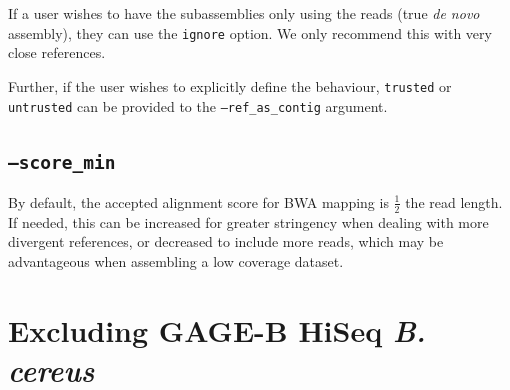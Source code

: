 \documentclass[10pt]{article}
\begin{document}
If a user wishes to have the subassemblies only using the reads (true \textit{de novo} assembly), they can use the \texttt{ignore} option.  We only recommend this with very close references.

Further, if the user wishes to explicitly define the behaviour, \texttt{trusted} or \texttt{untrusted} can be provided to the \texttt{--ref\_as\_contig} argument.

\subsection*{\texttt{--score\_min}}
By default, the accepted alignment score for BWA mapping is $\frac{1}{2}$ the read length.  If needed, this can be increased for greater stringency when dealing with more divergent references, or decreased to include more reads, which may be advantageous when assembling a low coverage dataset.

\section*{Excluding GAGE-B HiSeq \textit{B. cereus}}
\end{document}
